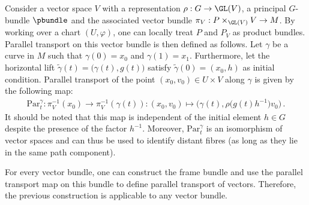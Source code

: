     \begin{example}
        Consider a vector space $V$ with a representation $\rho:G\rightarrow\GL(V)$, a principal $G$-bundle $\pbundle$ and the associated vector bundle $\pi_V:P\times_{\GL(V)}V\rightarrow M$. By working over a chart $(U,\varphi)$, one can locally treat $P$ and $P_V$ as product bundles. Parallel transport on this vector bundle is then defined as follows. Let $\gamma$ be a curve in $M$ such that $\gamma(0)=x_0$ and $\gamma(1)=x_1$. Furthermore, let the horizontal lift $\widetilde{\gamma}(t)=\bigl(\gamma(t),g(t)\bigr)$ satisfy $\widetilde{\gamma}(0)=(x_0,h)$ as initial condition. Parallel transport of the point $(x_0,v_0)\in U\times V$ along $\gamma$ is given by the following map:
        \begin{gather}
            \mathrm{Par}^\gamma_t:\pi^{-1}_V(x_0)\rightarrow\pi^{-1}_V(\gamma(t)):(x_0, v_0)\mapsto\bigl(\gamma(t),\rho\bigl(g(t)h^{-1}\bigr)v_0\bigr)\,.
        \end{gather}
        It should be noted that this map is independent of the initial element $h\in G$ despite the presence of the factor $h^{-1}$. Moreover, $\mathrm{Par}^\gamma_t$ is an isomorphism of vector spaces and can thus be used to identify distant fibres (as long as they lie in the same path component).
    \end{example}
    \begin{remark}
        For every vector bundle, one can construct the frame bundle and use the parallel transport map on this bundle to define parallel transport of vectors. Therefore, the previous construction is applicable to any vector bundle.
    \end{remark}

